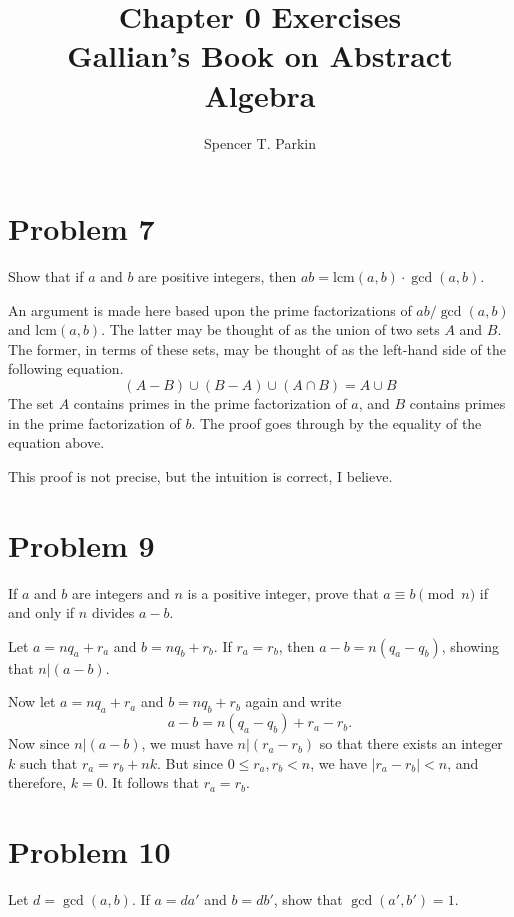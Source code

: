 \documentclass[12pt]{article}
\title{Chapter 0 Exercises\\Gallian's Book on Abstract Algebra}
\author{Spencer T. Parkin}
\newcommand{\lcm}{\mbox{lcm}}
\begin{document}
\maketitle

\section*{Problem 7}

Show that if $a$ and $b$ are positive integers, then $ab=\lcm(a,b)\cdot\gcd(a,b)$.

An argument is made here based upon the prime factorizations of $ab/\gcd(a,b)$
and $\lcm(a,b)$.  The latter may be thought of as the union of two sets $A$ and $B$.
The former, in terms of these sets, may be thought of as the left-hand side of the
following equation.
\begin{equation*}
(A-B)\cup(B-A)\cup (A\cap B) = A\cup B
\end{equation*}
The set $A$ contains primes in the prime factorization of $a$, and $B$ contains
primes in the prime factorization of $b$.  The proof goes through by the
equality of the equation above.

This proof is not precise, but the intuition is correct, I believe.

\section*{Problem 9}

If $a$ and $b$ are integers and $n$ is a positive integer, prove that $a\equiv b\pmod n$
if and only if $n$ divides $a-b$.

Let $a = nq_a + r_a$ and $b=nq_b+r_b$.  If $r_a=r_b$, then
$a-b=n(q_a-q_b)$, showing that $n|(a-b)$.

Now let $a = nq_a + r_a$ and $b=nq_b+r_b$ again and write
\begin{equation*}
a-b = n(q_a-q_b)+r_a-r_b.
\end{equation*}
Now since $n|(a-b)$, we must have $n|(r_a-r_b)$ so that there exists an integer
$k$ such that $r_a=r_b+nk$.  But since $0\leq r_a,r_b<n$, we have $|r_a-r_b|<n$,
and therefore, $k=0$.  It follows that $r_a=r_b$.

\section*{Problem 10}

Let $d=\gcd(a,b)$.  If $a=da'$ and $b=db'$, show that $\gcd(a',b')=1$.
\end{document}
